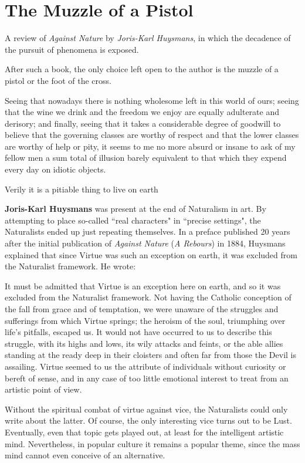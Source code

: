 \section{The Muzzle of a Pistol}

A review of \emph{Against Nature} by \emph{Joris-Karl Huysmans}, in which the decadence of the pursuit of phenomena is exposed.

\begin{quotex}
After such a book, the only choice left open to the author is the muzzle of a pistol or the foot of the cross. 

Seeing that nowadays there is nothing wholesome left in this world of ours; seeing that the wine we drink and the freedom we enjoy are equally adulterate and derisory; and finally, seeing that it takes a considerable degree of goodwill to believe that the governing classes are worthy of respect and that the lower classes are worthy of help or pity, it seems to me no more absurd or insane to ask of my fellow men a sum total of illusion barely equivalent to that which they expend every day on idiotic objects. 

Verily it is a pitiable thing to live on earth 

\end{quotex}
\textbf{Joris-Karl Huysmans} was present at the end of Naturalism in art. By attempting to place so-called ``real characters" in ``precise settings", the Naturalists ended up just repeating themselves. In a preface published 20 years after the initial publication of \emph{Against Nature} (\emph{A Rebours}) in 1884, Huysmans explained that since Virtue was such an exception on earth, it was excluded from the Naturalist framework. He wrote:

\begin{quotex}
It must be admitted that Virtue is an exception here on earth, and so it was excluded from the Naturalist framework. Not having the Catholic conception of the fall from grace and of temptation, we were unaware of the struggles and sufferings from which Virtue springs; the heroism of the soul, triumphing over life's pitfalls, escaped us. It would not have occurred to us to describe this struggle, with its highs and lows, its wily attacks and feints, or the able allies standing at the ready deep in their cloisters and often far from those the Devil is assailing. Virtue seemed to us the attribute of individuals without curiosity or bereft of sense, and in any case of too little emotional interest to treat from an artistic point of view. 

\end{quotex}
Without the spiritual combat of virtue against vice, the Naturalists could only write about the latter. Of course, the only interesting vice turns out to be Lust. Eventually, even that topic gets played out, at least for the intelligent artistic mind. Nevertheless, in popular culture it remains a popular theme, since the mass mind cannot even conceive of an alternative.


